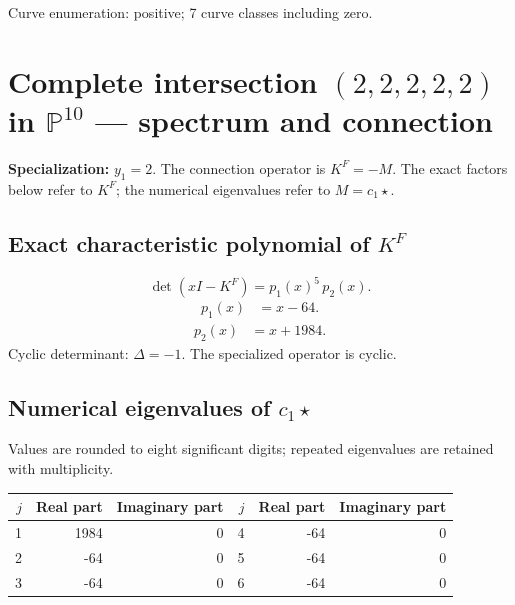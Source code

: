 \documentclass[10pt,a4paper]{article}
\begin{document}
Curve enumeration: positive; 7 curve classes including zero.
\clearpage\section*{Complete intersection $(2,2,2,2,2)$ in $\mathbb P^{10}$ --- spectrum and connection}
\textbf{Specialization:} $y_1=2$. The connection operator is $K^F=-M$. The exact factors below refer to $K^F$; the numerical eigenvalues refer to $M=c_1\star$.
\subsection*{Exact characteristic polynomial of $K^F$}
\[\det(xI-K^F)=p_{1}(x)^{5}\,p_{2}(x).\]
\[\begin{aligned}p_{1}(x)&=x - 64.\end{aligned}\]
\[\begin{aligned}p_{2}(x)&=x + 1984.\end{aligned}\]
Cyclic determinant: $\Delta=-1$. The specialized operator is cyclic.
\subsection*{Numerical eigenvalues of $c_1\star$}
Values are rounded to eight significant digits; repeated eigenvalues are retained with multiplicity.
\begin{center}\small\begin{tabular}{rrr@{\qquad}rrr}\toprule $j$ & Real part & Imaginary part & $j$ & Real part & Imaginary part\\\midrule
1 & 1984 & 0 & 4 & -64 & 0\\
2 & -64 & 0 & 5 & -64 & 0\\
3 & -64 & 0 & 6 & -64 & 0\\
\bottomrule\end{tabular}\end{center}
\end{document}
